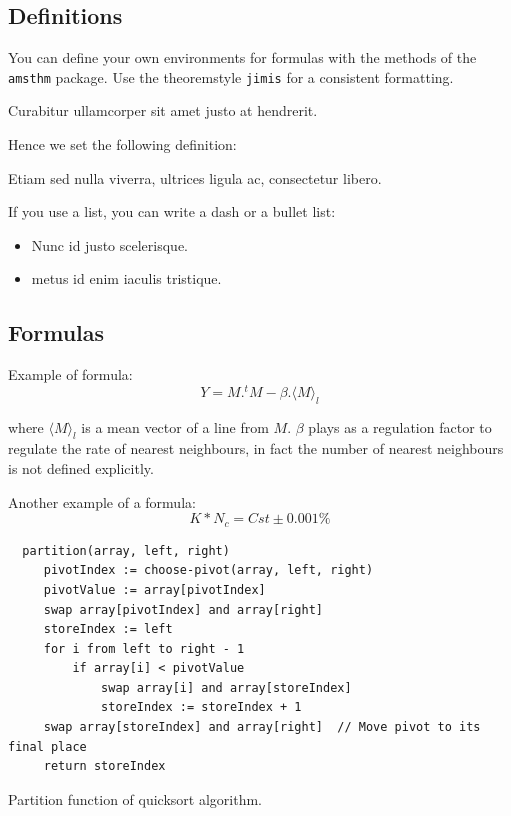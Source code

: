 \documentclass{jimis-en}
\begin{document}
\subsection{Definitions}
You can define your own environments for formulas with the methods of the \texttt{amsthm} package. Use the theoremstyle \texttt{jimis} for a consistent formatting.

\begin{definition}[alpha]
Curabitur ullamcorper sit amet justo at hendrerit.
\end{definition}

Hence we set the following definition:

\begin{definition}[beta]
Etiam sed nulla viverra, ultrices ligula ac, consectetur libero.
\end{definition}

If you use a list, you can write a dash or a bullet list:
\begin{itemize}
  \item Nunc id justo scelerisque.
  \item metus id enim iaculis tristique.
\end{itemize}

\subsection{Formulas}

Example of formula:
\begin{equation}
  Y=M.^tM-\beta.\langle M \rangle_l
\end{equation}

where $\langle M \rangle_l$ is a mean vector of a line from $M$. $\beta$ plays as a regulation factor to regulate the
rate of nearest neighbours, in fact the number of nearest neighbours is not defined explicitly.

Another example of a formula:
\begin{equation}
  K * N_c = Cst \pm 0.001\%
\end{equation}

\begin{listing}
  \begin{lstlisting}
  partition(array, left, right)
     pivotIndex := choose-pivot(array, left, right)
     pivotValue := array[pivotIndex]
     swap array[pivotIndex] and array[right]
     storeIndex := left
     for i from left to right - 1
         if array[i] < pivotValue
             swap array[i] and array[storeIndex]
             storeIndex := storeIndex + 1
     swap array[storeIndex] and array[right]  // Move pivot to its final place
     return storeIndex
  \end{lstlisting}
  \caption{Partition function of quicksort algorithm.}
  \label{lst:example}
\end{listing}
\end{document}
